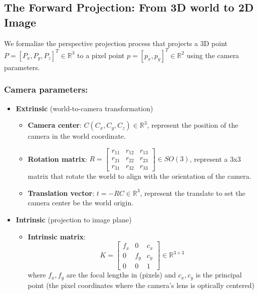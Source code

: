 \documentclass[12pt]{article}
\begin{document}
\newpage

\subsection{The Forward Projection: From 3D world to 2D Image}
We formalize the perspective projection process that projects a 3D point $P=[P_x,P_y,P_z]^T \in \mathbb{R}^3$ to a pixel point $p=[p_x,p_y]^T \in \mathbb{R}^2$ using the camera parameters.
\subsubsection*{Camera parameters:}
\begin{itemize}
    \item \textbf{Extrinsic} (world-to-camera transformation)
        \begin{itemize}
            \item \textbf{Camera center}: $C(C_x, C_y, C_z) \in \mathbb{R}^3$, represent the position of the camera in the world coordinate.
            \item \textbf{Rotation matrix}: $R = 
                \begin{bmatrix}
                    r_{11} & r_{12} & r_{13} \\
                    r_{21} & r_{22} & r_{23} \\
                    r_{31} & r_{32} & r_{33}
                \end{bmatrix}
                \in SO(3)$, represent a 3x3 matrix that rotate the world to align with the orientation of the camera.
            \item \textbf{Translation vector}: $t = -RC \in \mathbb{R}^3$, represent the translate to set the camera center be the world origin.
        \end{itemize}
    \item \textbf{Intrinsic} (projection to image plane)
        \begin{itemize}
            \item \textbf{Intrinsic matrix}: 
                \[
                    K = \begin{bmatrix}
                    f_x & 0 & c_x \\
                    0 & f_y & c_y \\ 
                    0 & 0 & 1
                    \end{bmatrix} \in \mathbb{R}^{3 \times 3}
                \]
            where \(f_x, f_y\) are the focal lengths in (pixels) and \(c_x, c_y\) is the principal point (the pixel coordinates where the camera's lens is optically centered)
        \end{itemize}
\end{itemize}
\end{document}
